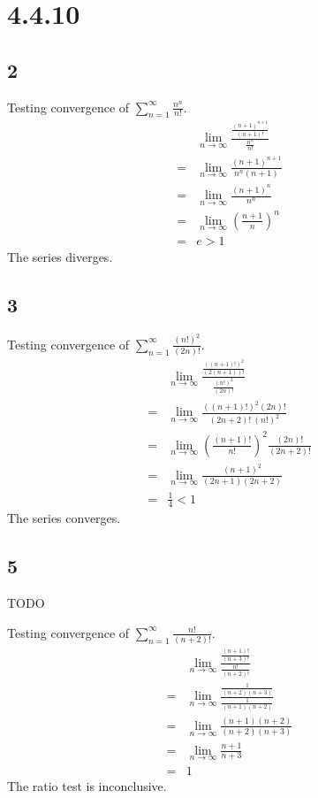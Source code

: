 \documentclass[12pt]{article}
\newcommand{\round}[1]{\left(       #1 \right)      }
\begin{document}
\section*{4.4.10}

\subsection*{2}
Testing convergence of $\sum_{n=1}^\infty \frac{n^n}{n!}$.
\begin{align*}
     & \lim_{n\to\infty} \frac{\frac{(n+1)^{n+1}}{(n+1)!}}{\frac{n^n}{n!}} \\
    =& \lim_{n\to\infty} \frac{(n+1)^{n+1}}{n^n (n+1)} \\
    =& \lim_{n\to\infty} \frac{(n+1)^n}{n^n} \\
    =& \lim_{n\to\infty} \round{\frac{n+1}{n}}^n \\
    =& e > 1
\end{align*}
The series diverges.



\subsection*{3}
Testing convergence of $\sum_{n=1}^\infty \frac{(n!)^2}{(2n)!}$.
\begin{align*}
     & \lim_{n\to\infty} \frac{\frac{((n+1)!)^2}{(2(n+1))!}}{\frac{(n!)^2}{(2n)!}} \\
    =& \lim_{n\to\infty} \frac{((n+1)!)^2 (2n)!}{(2n+2)!\ (n!)^2} \\
    =& \lim_{n\to\infty} \round{\frac{(n+1)!}{n!}}^2 \frac{(2n)!}{(2n+2)!} \\
    =& \lim_{n\to\infty} \frac{(n+1)^2}{(2n+1)(2n+2)} \\
    =& \frac{1}{4} < 1
\end{align*}
The series converges.



\subsection*{5}
TODO

Testing convergence of $\sum_{n=1}^\infty \frac{n!}{(n+2)!}$.
\begin{align*}
     & \lim_{n\to\infty} \frac{\frac{(n+1)!}{(n+3)!}}{\frac{n!}{(n+2)!}} \\
    =& \lim_{n\to\infty} \frac{\frac{1}{(n+2)(n+3)}}{\frac{1}{(n+1)(n+2)}} \\
    =& \lim_{n\to\infty} \frac{(n+1)(n+2)}{(n+2)(n+3)} \\
    =& \lim_{n\to\infty} \frac{n+1}{n+3} \\
    =& 1
\end{align*}
The ratio test is inconclusive.
\end{document}

